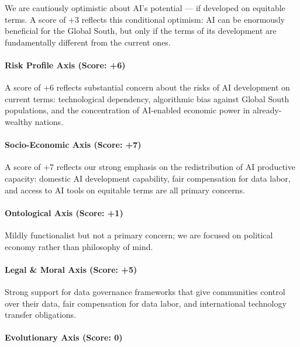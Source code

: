 We are cautiously optimistic about AI's potential --- if developed on
equitable terms. A score of +3 reflects this conditional optimism: AI
can be enormously beneficial for the Global South, but only if the terms
of its development are fundamentally different from the current ones.

\paragraph{Risk Profile Axis (Score:
+6)}\label{risk-profile-axis-score-6-5}

A score of +6 reflects substantial concern about the risks of AI
development on current terms: technological dependency, algorithmic bias
against Global South populations, and the concentration of AI-enabled
economic power in already-wealthy nations.

\paragraph{Socio-Economic Axis (Score:
+7)}\label{socio-economic-axis-score-7-1}

A score of +7 reflects our strong emphasis on the redistribution of AI
productive capacity: domestic AI development capability, fair
compensation for data labor, and access to AI tools on equitable terms
are all primary concerns.

\paragraph{Ontological Axis (Score:
+1)}\label{ontological-axis-score-1-2}

Mildly functionalist but not a primary concern; we are focused on
political economy rather than philosophy of mind.

\paragraph{Legal \& Moral Axis (Score:
+5)}\label{legal-moral-axis-score-5-7}

Strong support for data governance frameworks that give communities
control over their data, fair compensation for data labor, and
international technology transfer obligations.

\paragraph{Evolutionary Axis (Score:
0)}\label{evolutionary-axis-score-0-7}

